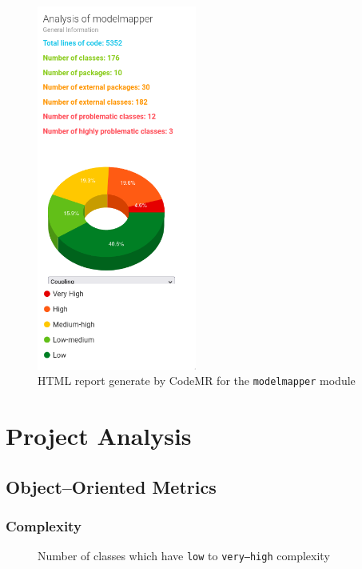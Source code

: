 \documentclass[12pt]{article}
\newcommand{\modelmapper}{\texttt{modelmapper}\xspace}
\begin{document}
\begin{figure}[H]
    \centering
    \includegraphics[height=12cm]{images/codemr-metrics.png}
    \caption{HTML report generate by CodeMR for the \modelmapper
    module}
    \label{codemr-metrics}
\end{figure}

\section{Project Analysis}

\subsection{Object--Oriented Metrics}

\subsubsection{Complexity}

\begin{figure}[H]
    \centering
    \caption{Number of classes which have \texttt{low} to
    \texttt{very--high} complexity}
\end{figure}
\end{document}
